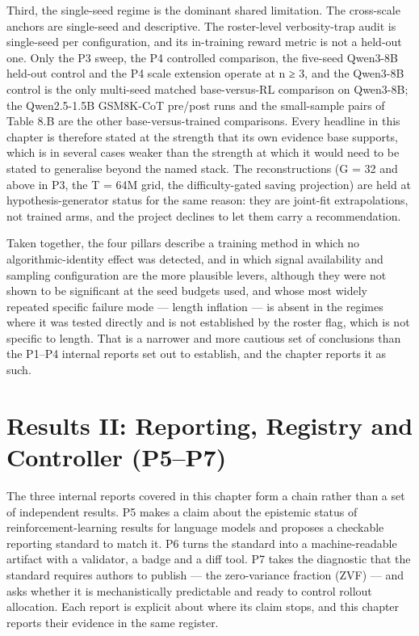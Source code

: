 \documentclass[12pt,a4paper]{report}
\begin{document}
Third, the single-seed regime is the dominant shared limitation. The
cross-scale anchors are single-seed and descriptive. The roster-level
verbosity-trap audit is single-seed per configuration, and its
in-training reward metric is not a held-out one. Only the P3 sweep, the
P4 controlled comparison, the five-seed Qwen3-8B held-out control and
the P4 scale extension operate at n ≥ 3, and the Qwen3-8B control is the
only multi-seed matched base-versus-RL comparison on Qwen3-8B; the
Qwen2.5-1.5B GSM8K-CoT pre/post runs and the small-sample pairs of Table
8.B are the other base-versus-trained comparisons. Every headline in
this chapter is therefore stated at the strength that its own evidence
base supports, which is in several cases weaker than the strength at
which it would need to be stated to generalise beyond the named stack.
The reconstructions (G = 32 and above in P3, the T = 64M grid, the
difficulty-gated saving projection) are held at hypothesis-generator
status for the same reason: they are joint-fit extrapolations, not
trained arms, and the project declines to let them carry a
recommendation.

Taken together, the four pillars describe a training method in which no
algorithmic-identity effect was detected, and in which signal
availability and sampling configuration are the more plausible levers,
although they were not shown to be significant at the seed budgets used,
and whose most widely repeated specific failure mode --- length
inflation --- is absent in the regimes where it was tested directly and
is not established by the roster flag, which is not specific to length.
That is a narrower and more cautious set of conclusions than the P1--P4
internal reports set out to establish, and the chapter reports it as
such.



\chapter{Results II: Reporting, Registry and Controller
(P5--P7)}\label{results-ii-reporting-registry-and-controller-p5p7}

The three internal reports covered in this chapter form a chain rather
than a set of independent results. P5 makes a claim about the epistemic
status of reinforcement-learning results for language models and
proposes a checkable reporting standard to match it. P6 turns the
standard into a machine-readable artifact with a validator, a badge and
a diff tool. P7 takes the diagnostic that the standard requires authors
to publish --- the zero-variance fraction (ZVF) --- and asks whether it
is mechanistically predictable and ready to control rollout allocation.
Each report is explicit about where its claim stops, and this chapter
reports their evidence in the same register.
\end{document}
